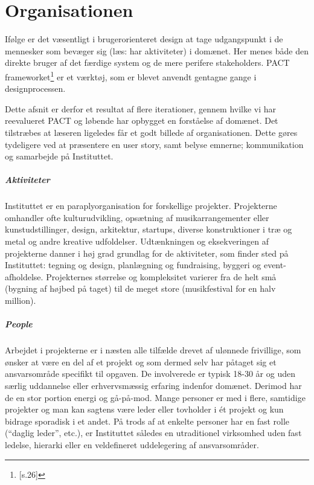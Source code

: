 \chapter{Organisationen}
Ifølge \citep{Benyon} er det væsentligt i brugerorienteret design at tage udgangspunkt i de mennesker som bevæger sig (læs: har aktiviteter) i domænet. Her menes både den direkte bruger af det færdige system og de mere perifere stakeholders. PACT frameworket\footnote{\citep{Benyon}[s.26]} er et værktøj, som er blevet anvendt gentagne gange i designprocessen. 

Dette afsnit er derfor et resultat af flere iterationer, gennem hvilke vi har reevalueret PACT og løbende har opbygget en forståelse af domænet. Det tilstræbes at læseren ligeledes får et godt billede af organisationen. Dette gøres tydeligere ved at præsentere en user story, samt belyse emnerne; kommunikation og samarbejde på Instituttet.     

\paragraph{Aktiviteter}
Instituttet er en paraplyorganisation for forskellige projekter. Projekterne omhandler ofte kulturudvikling, opsætning af musikarrangementer eller kunstudstillinger, design, arkitektur, startups, diverse konstruktioner i træ og metal og andre kreative udfoldelser. Udtænkningen og eksekveringen af projekterne danner i høj grad grundlag for de aktiviteter, som finder sted på Instituttet: tegning og design, planlægning og fundraising, byggeri og event-afholdelse. Projekternes størrelse og kompleksitet varierer fra de helt små (bygning af højbed på taget) til de meget store (musikfestival for en halv million). 

\paragraph{People}
Arbejdet i projekterne er i næsten alle tilfælde drevet af ulønnede frivillige, som ønsker at være en del af et projekt og som dermed selv har påtaget sig et ansvarsområde specifikt til opgaven. De involverede er typisk 18-30 år og uden særlig uddannelse eller erhvervsmæssig erfaring indenfor domænet. Derimod har de en stor portion energi og gå-på-mod. Mange personer er med i flere, samtidige projekter og man kan sagtens være leder eller tovholder i ét projekt og kun bidrage sporadisk i et andet. På trods af at enkelte personer har en fast rolle (“daglig leder”, etc.), er Instituttet således en utraditionel virksomhed uden fast ledelse, hierarki eller en veldefineret uddelegering af ansvarsområder.


